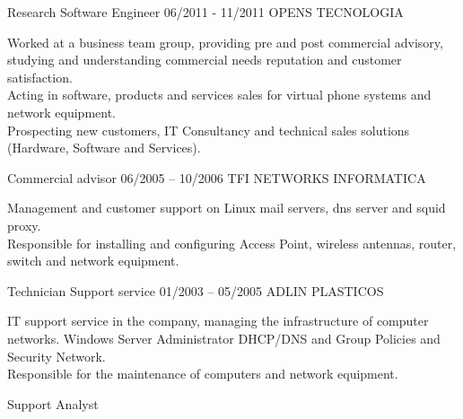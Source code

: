 \documentclass[9pt, green]{./template/developercv} %
\begin{document}
\begin{entrylist}
{\begin{minipage}[t]{0.75\textwidth}
 			\vspace{-9mm}
		\end{minipage}
	}
	{Research Software Engineer}
	\entry
	{06/2011 - 11/2011}
	{OPENS TECNOLOGIA}
	{}
	{
		\vspace{0.3mm}
		\begin{minipage}[t]{0.75\textwidth}
			\vspace{-\baselineskip}
			\itemmarker Worked at a business team group, providing pre and post commercial advisory, studying and understanding commercial needs reputation and customer satisfaction. \\
			\itemmarker Acting in software, products and services sales for virtual phone systems and network equipment. \\
			\itemmarker Prospecting new customers, IT Consultancy and technical sales solutions (Hardware, Software and Services). \\
 			\vspace{-9mm}
		\end{minipage}
	}
	{Commercial advisor}
	\entry
		{06/2005 -- 10/2006}
		{TFI NETWORKS INFORMATICA}
		{}
		{
			\vspace{0.3mm}
			\begin{minipage}[t]{0.75\textwidth}
				\vspace{-\baselineskip}
				\itemmarker Management and customer support on Linux mail servers, dns server and squid proxy. \\
				\itemmarker Responsible for installing and configuring Access Point, wireless antennas, router, switch and network equipment.\\
 			\vspace{-9mm}
			\end{minipage}
	   }
		{Technician \band Support service}
	\entry
	{01/2003 -- 05/2005 }
	{ADLIN PLASTICOS}
	{}
	{
		\vspace{0.4mm}
		\begin{minipage}[t]{0.75\textwidth} %
			\vspace{-\baselineskip} \small
			\vspace{-2mm}
				\itemmarker IT support service in the company, managing the infrastructure of computer networks. Windows Server Administrator DHCP/DNS and Group Policies and Security Network. \\
				\itemmarker Responsible for the maintenance of computers and network equipment. \\
 			\vspace{12pt}

		\end{minipage}
	}
	{Support Analyst}
\end{entrylist}
\end{document}
